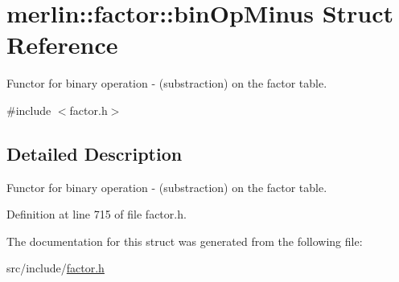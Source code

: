 \hypertarget{structmerlin_1_1factor_1_1binOpMinus}{}\section{merlin\+:\+:factor\+:\+:bin\+Op\+Minus Struct Reference}
\label{structmerlin_1_1factor_1_1binOpMinus}


Functor for binary operation -\/ (substraction) on the factor table.  




{\ttfamily \#include $<$factor.\+h$>$}



\subsection{Detailed Description}
Functor for binary operation -\/ (substraction) on the factor table. 

Definition at line 715 of file factor.\+h.



The documentation for this struct was generated from the following file\+:\begin{DoxyCompactItemize}
\item 
src/include/\hyperlink{factor_8h}{factor.\+h}\end{DoxyCompactItemize}
